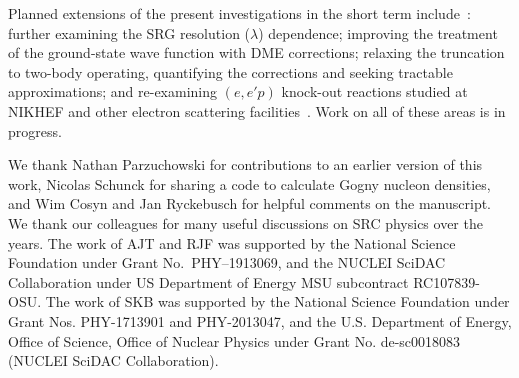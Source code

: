 \documentclass[10pt,aps,prc,floatfix,twocolumn,nofootinbib]{revtex4-1}
\begin{document}
        
        
        
        

Planned extensions of the present investigations in the short term include~\cite{Tropiano:2021prep}:
further examining the SRG resolution ($\lambda$) dependence; improving the treatment of the ground-state wave function with DME corrections; relaxing the truncation to two-body operating, quantifying the corrections and seeking tractable approximations; and re-examining $(e,e'p)$ knock-out reactions  studied at NIKHEF and other electron scattering facilities~\cite{Dieperink:1990uk,Kelly:1996hd}.
Work on all of these areas is in progress.

    



\begin{acknowledgments}
We thank Nathan Parzuchowski for contributions to an earlier version of this work, Nicolas Schunck for sharing a code to calculate Gogny nucleon densities, and Wim Cosyn and Jan Ryckebusch for helpful comments on the manuscript. We thank our colleagues for many useful discussions on SRC physics over the years.
The work of AJT and RJF was supported by the National Science Foundation under Grant No.~PHY--1913069, and the NUCLEI SciDAC Collaboration under US Department of Energy MSU subcontract RC107839-OSU\@.
The work of SKB was supported by the National Science Foundation under Grant Nos. PHY-1713901 and PHY-2013047, and the U.S. Department of Energy, Office of Science, Office of Nuclear Physics under Grant No. de-sc0018083 (NUCLEI SciDAC Collaboration).
\end{acknowledgments}
\end{document}
